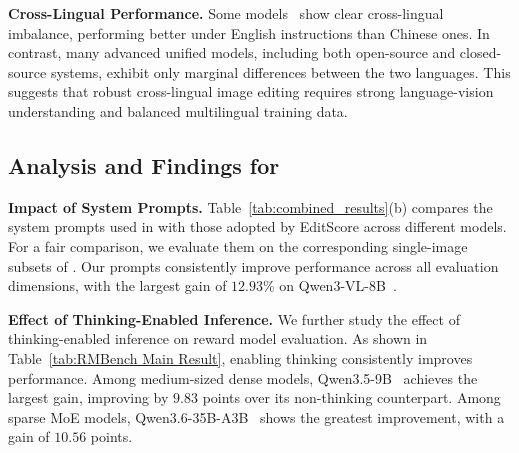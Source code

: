 \textbf{Cross-Lingual Performance.}
Some models~\cite{li2025uniworld,labs2025flux} show clear cross-lingual imbalance, performing better under English instructions than Chinese ones. In contrast, many advanced unified models, including both open-source and closed-source systems, exhibit only marginal differences between the two languages. This suggests that robust cross-lingual image editing requires strong language-vision understanding and balanced multilingual training data.

\subsection{Analysis and Findings for {\rmbench}}

\textbf{Impact of System Prompts.}
Table~\ref{tab:combined_results}(b) compares the system prompts used in {\rmbench} with those adopted by EditScore across different models. For a fair comparison, we evaluate them on the corresponding single-image subsets of {\rmbench}. Our prompts consistently improve performance across all evaluation dimensions, with the largest gain of $12.93$\% on Qwen3-VL-8B~\cite{bai2025qwen3}.

\textbf{Effect of Thinking-Enabled Inference.}
We further study the effect of thinking-enabled inference on reward model evaluation. As shown in Table~\ref{tab:RMBench Main Result}, enabling thinking consistently improves performance. Among medium-sized dense models, Qwen3.5-9B~\cite{qwen3.5} achieves the largest gain, improving by $9.83$ points over its non-thinking counterpart. Among sparse MoE models, Qwen3.6-35B-A3B~\citep{qwen36_35b_a3b} shows the greatest improvement, with a gain of $10.56$ points.